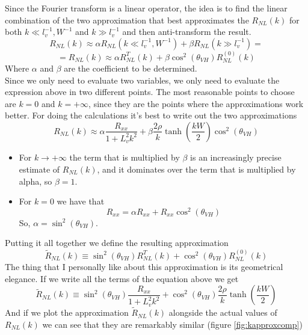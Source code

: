 Since the Fourier transform is a linear operator, the idea is to find the linear combination of the two approximation that best approximates the $R_{NL}(k)$ for both $k\ll l_v^{-1},W^{-1}$ and $k\gg l_v^{-1}$ and then anti-transform the result.
\[
    R_{NL}(k)\approx \alpha R_{NL}(k\ll l_v^{-1},W^{-1}) +\beta R_{NL}(k\gg l_v^{-1})=
\]
\[
    =R_{NL}(k)\approx \alpha R_{NL}^T(k) +\beta\cos^2(\theta_{VH}) R_{NL}^{(0)}(k)      
\]
Where $\alpha$ and $\beta$ are the coefficient to be determined.\\
Since we only need to evaluate two variables, we only need to evaluate the expression above in two different points. The most reasonable points to choose are $k=0$ and $k=+\infty$, since they are the points where the approximations work better. For doing the calculations it's best to write out the two approximations 
\[
    R_{NL}(k)\approx 
    \alpha \frac {R_{xx}}{1+L_v^2k^2}+
    \beta\frac {2\rho}{k}\tanh\left(\frac{kW}2\right)\cos^2(\theta_{VH})
\]
\begin{itemize}
    \item For $k\to +\infty$ the term that is multiplied by $\beta$ is an increasingly precise estimate of $R_{NL}(k)$, and it dominates over the term that is multiplied by alpha, so $\beta=1$.
    \item For $k=0$ we have that
    \[
        R_{xx}=\alpha R_{xx} +  R_{xx}\cos^2(\theta_{VH})   
    \]
    So, $\alpha=\sin^2(\theta_{VH})$. 
\end{itemize}
Putting it all together we define the resulting approximation
\begin{equation}
    \boxed{
        \tilde R_{NL}(k)\equiv
        \sin^2(\theta_{VH})R_{NL}^{T}(k)+
        \cos^2(\theta_{VH})R_{NL}^{(0)}(k)
    }
\end{equation}
The thing that I personally like about this approximation is its geometrical elegance. If we write all the terms of the equation above we get
\begin{equation}
    \tilde R_{NL}(k)\equiv
    \sin^2(\theta_{VH})\frac {R_{xx}}{1+L_v^2k^2}+
    \cos^2(\theta_{VH})\frac {2\rho}{k}\tanh\left(\frac{kW}2\right)
\end{equation}
And if we plot the approximation $\tilde R_{NL}(k)$ alongside the actual values of $R_{NL}(k)$ we can see that they are remarkably similar (figure \ref{fig:kapproxcomp})
